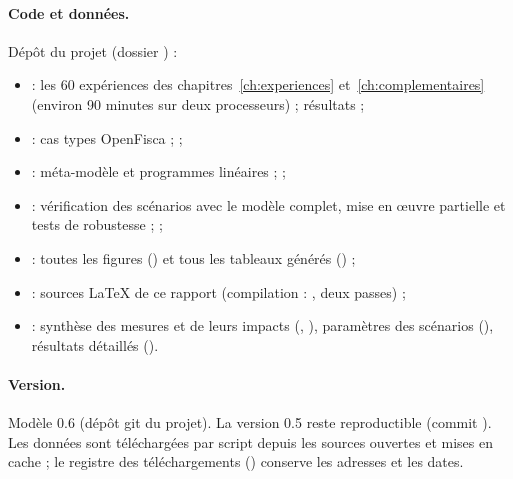 \paragraph{Code et données.} Dépôt du projet (dossier ) :
\begin{itemize}
\item {} : les 60 expériences des chapitres~\ref{ch:experiences} et~\ref{ch:complementaires}
(environ 90 minutes sur deux processeurs) ; résultats  ;
\item {} : cas types OpenFisca ;  ;
\item {} : méta-modèle et programmes linéaires ;  ;
\item {} : vérification des scénarios avec le modèle complet, mise en œuvre partielle et
tests de robustesse ;  ;
\item {} : toutes les figures () et tous les tableaux générés
() ;
\item {} : sources LaTeX de ce rapport (compilation : , deux passes) ;
\item {} : synthèse des mesures et de leurs impacts (,
), paramètres des scénarios (), résultats détaillés ().
\end{itemize}

\paragraph{Version.} Modèle 0.6 (dépôt git du projet). La version 0.5 reste reproductible (commit ).
Les données sont téléchargées par script depuis les sources ouvertes et mises en cache ; le registre des téléchargements
() conserve les adresses et les dates.

